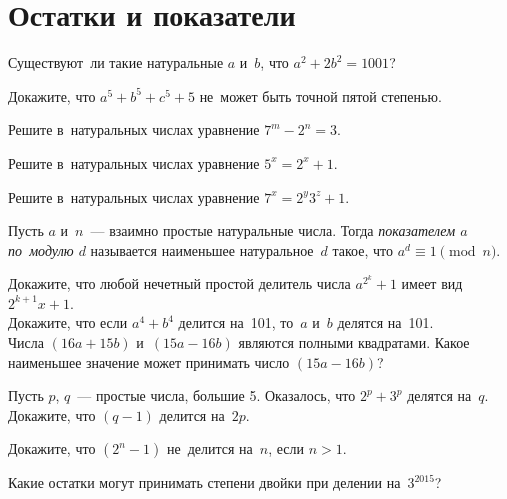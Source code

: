 
\section*{Остатки и показатели}


\begin{problems}

\item
Существуют~ли такие натуральные $a$ и~$b$, что $a^2 + 2 b^2 = 1001$?

\item
Докажите, что $a^5 + b^5 + c^5 + 5$ не~может быть точной пятой степенью.

\item
Решите в~натуральных числах уравнение $7^m - 2^n = 3$.

\item
Решите в~натуральных числах уравнение $5^x = 2^x + 1$.

\item
Решите в~натуральных числах уравнение $7^x = 2^y 3^z + 1$.

\end{problems}

Пусть $a$ и~$n$~--- взаимно простые натуральные числа.
Тогда \emph{показателем $a$ по~модулю $d$} называется наименьшее
натуральное~$d$ такое, что $a^d \equiv 1 \pmod{n}$.

\begin{problems}

\item
\subproblem
Докажите, что любой нечетный простой делитель числа $a^{2^k} + 1$ имеет вид
$2^{k+1} x + 1$.
\\
\subproblem
Докажите, что если $a^4 + b^4$ делится на~101, то~$a$ и~$b$ делятся на~101.
\\
\subproblem
Числа $(16 a + 15 b)$ и~$(15 a - 16 b)$ являются полными квадратами.
Какое наименьшее значение может принимать число $(15 a - 16 b)$?

\item
Пусть $p$, $q$~--- простые числа, большие 5.
Оказалось, что $2^p + 3^p$ делятся на~$q$.
Докажите, что $(q - 1)$ делится на~$2 p$.

\item
Докажите, что $(2^n - 1)$ не~делится на~$n$, если $n > 1$.

\item
Какие остатки могут принимать степени двойки при делении на~$3^{2015}$?

\end{problems}


